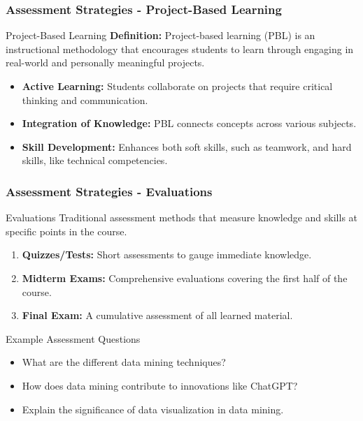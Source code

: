 \documentclass[aspectratio=169]{beamer}
\begin{document}
\begin{frame}[fragile]
    \frametitle{Assessment Strategies - Project-Based Learning}
    \begin{block}{Project-Based Learning}
        \textbf{Definition:} Project-based learning (PBL) is an instructional methodology that encourages students to learn through engaging in real-world and personally meaningful projects.
    \end{block}

    \begin{itemize}
        \item \textbf{Active Learning:} Students collaborate on projects that require critical thinking and communication.
        \item \textbf{Integration of Knowledge:} PBL connects concepts across various subjects.
        \item \textbf{Skill Development:} Enhances both soft skills, such as teamwork, and hard skills, like technical competencies.
    \end{itemize}
\end{frame}

\begin{frame}[fragile]
    \frametitle{Assessment Strategies - Evaluations}
    \begin{block}{Evaluations}
        Traditional assessment methods that measure knowledge and skills at specific points in the course.
    \end{block}

    \begin{enumerate}
        \item \textbf{Quizzes/Tests:} Short assessments to gauge immediate knowledge.
        \item \textbf{Midterm Exams:} Comprehensive evaluations covering the first half of the course.
        \item \textbf{Final Exam:} A cumulative assessment of all learned material.
    \end{enumerate}

    \begin{block}{Example Assessment Questions}
        \begin{itemize}
            \item What are the different data mining techniques?
            \item How does data mining contribute to innovations like ChatGPT?
            \item Explain the significance of data visualization in data mining.
        \end{itemize}
    \end{block}
\end{frame}
\end{document}
